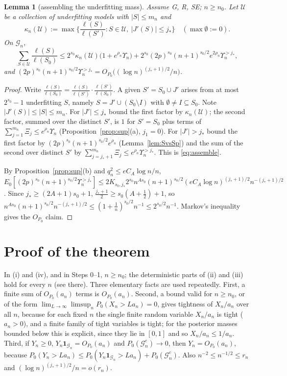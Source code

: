 \documentclass[11pt]{article}
\newtheorem{lemma}[theorem]{Lemma}
\theoremstyle{definition}
\newcommand{\Pp}{P_0}
\newcommand{\E}{E_0}
\newcommand{\1}{\mathbf 1}
\newcommand{\Gn}{\mathcal G_n}
\newcommand{\Uc}{\mathcal U}
\begin{document}
\begin{lemma}[assembling the underfitting mass]\label{lem:assemble}
Assume G, R, SE; $n\ge n_0$. Let $\Uc$ be a collection of underfitting models with $|S|\le m_n$ and
\[
\kappa_n(\Uc):=\max\Big\{\frac{\ell(S)}{\ell(S')}:S\in\Uc,\ |J'(S)|\le j_*\Big\}\quad(\max\emptyset:=0).
\]
On $\Gn$,
\begin{equation}\label{eq:assemble}
\sum_{S\in\Uc}\frac{\ell(S)}{\ell(S_0)}\le2^{s_0}\kappa_n(\Uc)\big(1+e^{\rho_n}\Upsilon_n\big)+2^{s_0}(2p)^{s_0}(n+1)^{s_0/2}e^{2\rho_n}\Upsilon_n^{>j_*},
\end{equation}
and $(2p)^{s_0}(n+1)^{s_0/2}\Upsilon_n^{>j_*}=O_{\Pp}\big((\log n)^{(j_*+1)/2}/n\big)$.
\end{lemma}

\begin{proof}
Write $\frac{\ell(S)}{\ell(S_0)}=\frac{\ell(S)}{\ell(S')}\cdot\frac{\ell(S')}{\ell(S_0)}$. A given $S'=S_0\cup J'$ arises from at most $2^{s_0}-1$ underfitting $S$, namely $S=J'\cup(S_0\setminus I)$ with $\emptyset\ne I\subseteq S_0$. Note $|J'(S)|\le|S|\le m_n$. For $|J'|\le j_*$ bound the first factor by $\kappa_n(\Uc)$; the second factor, summed over the distinct $S'$, is $1$ for $S'=S_0$ plus terms of $\sum_{j=1}^{m_n}\Xi_j\le e^{\rho_n}\Upsilon_n$ (Proposition~\ref{prop:sup}(a), $j_1=0$). For $|J'|>j_*$ bound the first factor by $(2p)^{s_0}(n+1)^{s_0/2}e^{\rho_n}$ (Lemma~\ref{lem:SvsSp}) and the sum of the second over distinct $S'$ by $\sum_{j=j_*+1}^{m_n}\Xi_j\le e^{\rho_n}\Upsilon_n^{>j_*}$. This is \eqref{eq:assemble}.

By Proposition~\ref{prop:sup}(b) and $q_n^2\le eC_A\log n/n$, $\E[(2p)^{s_0}(n+1)^{s_0/2}\Upsilon_n^{>j_*}]\le2K_{s_0,j_*}2^{s_0}n^{As_0}(n+1)^{s_0/2}(eC_A\log n)^{(j_*+1)/2}n^{-(j_*+1)/2}$. Since $j_*\ge(2A+1)s_0+1$, $\frac{j_*+1}2\ge s_0(A+\frac12)+1$, so $n^{As_0}(n+1)^{s_0/2}n^{-(j_*+1)/2}\le(1+\frac1n)^{s_0/2}n^{-1}\le2^{s_0/2}n^{-1}$. Markov's inequality gives the $O_{\Pp}$ claim.
\end{proof}

\section{Proof of the theorem}\label{sec:main}

In (i) and (iv), and in Steps 0--1, $n\ge n_0$; the deterministic parts of (ii) and (iii) hold for every $n$ (see there). Three elementary facts are used repeatedly. First, a finite sum of $O_{\Pp}(a_n)$ terms is $O_{\Pp}(a_n)$. Second, a bound valid for $n\ge n_0$, or of the form $\lim_{L\to\infty}\limsup_n\Pp(X_n>La_n)=0$, gives tightness of $X_n/a_n$ over all $n$, because for each fixed $n$ the single finite random variable $X_n/a_n$ is tight ($a_n>0$), and a finite family of tight variables is tight; for the posterior masses bounded below this is explicit, since they lie in $[0,1]$ and so $X_n/a_n\le1/a_n$. Third, if $Y_n\ge0$, $Y_n\1_{\Gn}=O_{\Pp}(a_n)$ and $\Pp(\Gn^c)\to0$, then $Y_n=O_{\Pp}(a_n)$, because $\Pp(Y_n>La_n)\le\Pp(Y_n\1_{\Gn}>La_n)+\Pp(\Gn^c)$. Also $n^{-2}\le n^{-1/2}\le r_n$ and $(\log n)^{(j_*+1)/2}/n=o(r_n)$.
\end{document}
